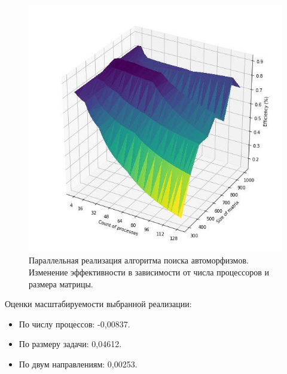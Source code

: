 \begin{figure}[ht]
\centering 
    \includegraphics[scale=0.8]{image/ef.jpg}
    \caption{Параллельная реализация алгоритма поиска автоморфизмов. Изменение эффективности в зависимости от числа процессоров и размера матрицы.}
    \label{srg}
\end{figure}

Оценки масштабируемости выбранной реализации:
\begin{itemize}
\item По числу процессов: -0,00837.
\item По размеру задачи: 0,04612. 
\item По двум направлениям: 0,00253.
\end{itemize}
